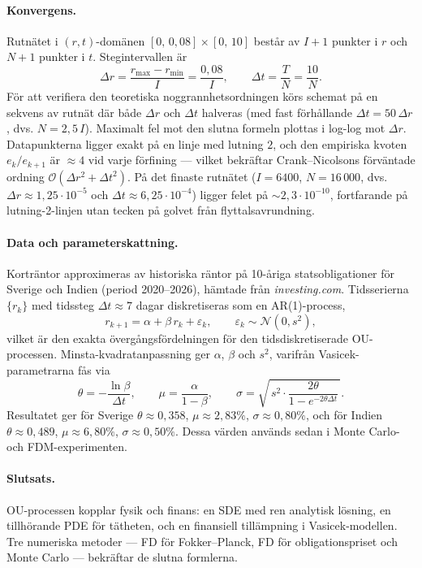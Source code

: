 \documentclass[11pt,a4paper]{article}
\begin{document}
\paragraph{Konvergens.}
Rutnätet i $(r,t)$-domänen $[0,\,0{,}08]\times[0,\,10]$ består av $I+1$
punkter i $r$ och $N+1$ punkter i $t$. Stegintervallen är
\[
    \Delta r = \frac{r_{\max}-r_{\min}}{I} = \frac{0{,}08}{I},
    \qquad
    \Delta t = \frac{T}{N} = \frac{10}{N}.
\]
För att verifiera den teoretiska noggrannhetsordningen körs schemat på
en sekvens av rutnät där både $\Delta r$ och $\Delta t$ halveras
(med fast förhållande $\Delta t = 50\,\Delta r$, dvs. $N = 2{,}5\,I$).
Maximalt fel mot den slutna formeln plottas i log-log mot $\Delta r$.
Datapunkterna ligger exakt på en linje med lutning $2$, och den
empiriska kvoten $e_k/e_{k+1}$ är $\approx 4$ vid varje förfining ---
vilket bekräftar Crank--Nicolsons förväntade ordning
$\mathcal{O}(\Delta r^2 + \Delta t^2)$. På det finaste rutnätet
($I = 6400$, $N = 16\,000$, dvs.\ $\Delta r \approx 1{,}25\cdot 10^{-5}$
och $\Delta t \approx 6{,}25\cdot 10^{-4}$) ligger felet på
$\sim 2{,}3\cdot 10^{-10}$, fortfarande på lutning-2-linjen utan tecken
på golvet från flyttalsavrundning.

\paragraph{Data och parameterskattning.}
Korträntor approximeras av historiska räntor på 10-åriga statsobligationer
för Sverige och Indien (period 2020--2026), hämtade från
\textit{investing.com}. Tidsserierna $\{r_k\}$ med tidssteg
$\Delta t \approx 7$ dagar diskretiseras som en AR(1)-process,
\[
    r_{k+1} = \alpha + \beta\, r_k + \varepsilon_k,
    \qquad \varepsilon_k \sim \mathcal{N}(0, s^2),
\]
vilket är den exakta övergångsfördelningen för den tidsdiskretiserade
OU-processen. Minsta-kvadrat\-anpassning ger $\alpha$, $\beta$ och $s^2$,
varifrån Vasicek-parametrarna fås via
\[
    \theta = -\frac{\ln \beta}{\Delta t}, \qquad
    \mu = \frac{\alpha}{1-\beta}, \qquad
    \sigma = \sqrt{\,s^2 \cdot \frac{2\theta}{1-e^{-2\theta\Delta t}}\,}.
\]
Resultatet ger för Sverige $\theta\approx 0{,}358$, $\mu\approx 2{,}83\%$,
$\sigma\approx 0{,}80\%$, och för Indien $\theta\approx 0{,}489$,
$\mu\approx 6{,}80\%$, $\sigma\approx 0{,}50\%$. Dessa värden används
sedan i Monte Carlo- och FDM-experimenten.

\paragraph{Slutsats.}
OU-processen kopplar fysik och finans: en SDE med ren analytisk
lösning, en tillhörande PDE för tätheten, och en finansiell tillämpning
i Vasicek-modellen. Tre numeriska metoder --- FD för Fokker--Planck,
FD för obligationspriset och Monte Carlo --- bekräftar de slutna
formlerna.
\end{document}
